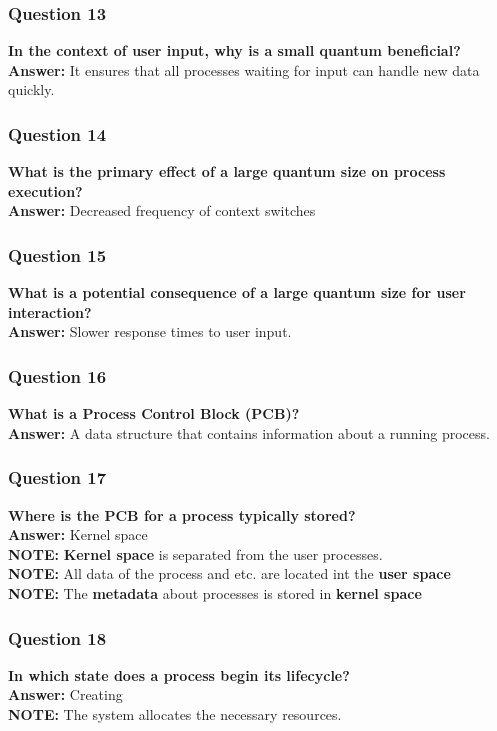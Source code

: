 \documentclass{article}
\begin{document}
\subsubsection*{Question 13}
\textbf{In the context of user input, why is a small quantum beneficial?} \\
\textbf{Answer:} It ensures that all processes waiting for input can handle new data quickly.

\subsubsection*{Question 14}
\textbf{What is the primary effect of a large quantum size on process execution?} \\
\textbf{Answer:} Decreased frequency of context switches

\subsubsection*{Question 15}
\textbf{What is a potential consequence of a large quantum size for user interaction?} \\
\textbf{Answer:} Slower response times to user input.

\subsubsection*{Question 16}
\textbf{What is a Process Control Block (PCB)?} \\
\textbf{Answer:} A data structure that contains information about a running process.

\subsubsection*{Question 17}
\textbf{Where is the PCB for a process typically stored?} \\
\textbf{Answer:} Kernel space \\
\textbf{NOTE:} \textbf{Kernel space} is separated from the user processes. \\
\textbf{NOTE:} All data of the process and etc. are located int the \textbf{user space} \\
\textbf{NOTE:} The \textbf{metadata} about processes is stored in \textbf{kernel space}

\subsubsection*{Question 18}
\textbf{In which state does a process begin its lifecycle?} \\
\textbf{Answer:} Creating \\
\textbf{NOTE:} The system allocates the necessary resources.
\end{document}
